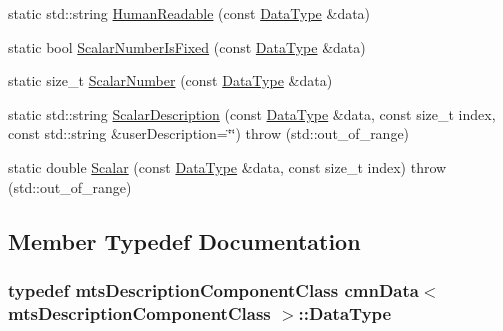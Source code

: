 \begin{DoxyCompactItemize}
\item 
static std\-::string \hyperlink{classcmn_data_3_01mts_description_component_class_01_4_a0f82cf0bef46e7576ddbf6254109578b}{Human\-Readable} (const \hyperlink{classcmn_data_3_01mts_description_component_class_01_4_a63c14a01f80b214ab860f6a0e04afa31}{Data\-Type} \&data)
\item 
static bool \hyperlink{classcmn_data_3_01mts_description_component_class_01_4_a7b79286a44364679256b71c049cfa765}{Scalar\-Number\-Is\-Fixed} (const \hyperlink{classcmn_data_3_01mts_description_component_class_01_4_a63c14a01f80b214ab860f6a0e04afa31}{Data\-Type} \&data)
\item 
static size\-\_\-t \hyperlink{classcmn_data_3_01mts_description_component_class_01_4_a1b43303d994e4f189d903c96b202e4a2}{Scalar\-Number} (const \hyperlink{classcmn_data_3_01mts_description_component_class_01_4_a63c14a01f80b214ab860f6a0e04afa31}{Data\-Type} \&data)
\item 
static std\-::string \hyperlink{classcmn_data_3_01mts_description_component_class_01_4_acc2f998a973fdb9aa86eec58dc1d69a6}{Scalar\-Description} (const \hyperlink{classcmn_data_3_01mts_description_component_class_01_4_a63c14a01f80b214ab860f6a0e04afa31}{Data\-Type} \&data, const size\-\_\-t index, const std\-::string \&user\-Description=\char`\"{}\char`\"{})  throw (std\-::out\-\_\-of\-\_\-range)
\item 
static double \hyperlink{classcmn_data_3_01mts_description_component_class_01_4_a3483a7957f264d2b34db053de3466a02}{Scalar} (const \hyperlink{classcmn_data_3_01mts_description_component_class_01_4_a63c14a01f80b214ab860f6a0e04afa31}{Data\-Type} \&data, const size\-\_\-t index)  throw (std\-::out\-\_\-of\-\_\-range)
\end{DoxyCompactItemize}


\subsection{Member Typedef Documentation}
\hypertarget{classcmn_data_3_01mts_description_component_class_01_4_a63c14a01f80b214ab860f6a0e04afa31}{
\subsubsection[{Data\-Type}]{\setlength{\rightskip}{0pt plus 5cm}typedef {\bf mts\-Description\-Component\-Class} {\bf cmn\-Data}$<$ {\bf mts\-Description\-Component\-Class} $>$\-::{\bf Data\-Type}}}\label{classcmn_data_3_01mts_description_component_class_01_4_a63c14a01f80b214ab860f6a0e04afa31}



